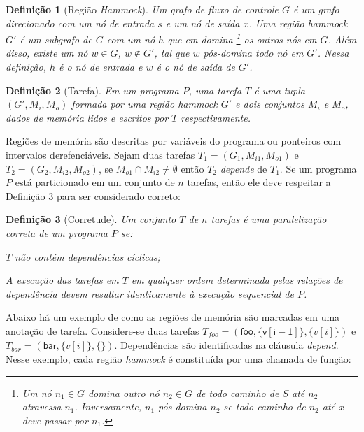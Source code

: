 \documentclass[sigplan,10pt,review]{acmart}
\newtheorem{Definicao}{Defini\c{c}\~{a}o}
\begin{document}
\begin{Definicao} [Região \textit{Hammock}]
\label{def:hammock}
Um grafo de fluxo de controle $G$ é um grafo direcionado com um nó de entrada
$s$ e um nó de saída $x$. Uma região \textit{hammock} $G'$ é um subgrafo de $G$ com um nó $h$ que {em domina}
\footnote{Um nó $n_1 \in G$ domina outro nó
$n_2 \in G$ de todo caminho de  $S$ até $n_2$ atravessa $n_1$.
Inversamente, $n_1$ pós-domina $n_2$ se todo caminho de $n_2$ até $x$ deve passar por $n_1$.} os outros nós em $G$.
Além disso, existe um nó $w \in G$, $w \notin G'$, tal que $w$ {\em pós-domina} todo nó em $G'$. Nessa definição,
$h$ é o nó de entrada e $w$ é o nó de saída de $G'$.  
\end{Definicao}

\begin{Definicao} [Tarefa]
\label{def:task}
Em um programa $P$, uma tarefa $T$ é uma tupla $(G', M_i, M_o)$ formada
por uma região \textit{hammock} $G'$ e dois conjuntos $M_i$ e $M_o$, dados de memória lidos e escritos por $T$ respectivamente.
\end{Definicao}

Regiões de memória são descritas por variáveis do programa ou ponteiros com intervalos derefenciáveis.
Sejam duas tarefas $T_1 = (G_1, M_{i1}, M_{o1})$ e $T_2 = (G_2, M_{i2}, M_{o2})$, 
se $M_{o1} \cap M_{i2} \neq \emptyset$ então $T_2$ {\em depende} de $T_1$. Se um programa $P$ está particionado em um 
conjunto de $n$ tarefas, então ele deve respeitar a Definição \ref{def:corretude} para ser considerado correto:

\begin{Definicao} [Corretude]
\label{def:corretude}
Um conjunto $T$ de $n$ tarefas é uma paralelização correta de um programa $P$ se:
\begin{compactenum}
\item $T$ não contém dependências cíclicas;
\item A execução das tarefas em $T$ em qualquer ordem determinada pelas relações de dependência devem resultar
identicamente à execução sequencial de $P$.
\end{compactenum}
\end{Definicao}

Abaixo há um exemplo de como as regiões de memória são marcadas em uma anotação de tarefa.
Considere-se duas tarefas $T_{\mathit{foo}} = (\mathsf{foo}, \{\mathsf{v[i - 1]}\},
\{v[i]\})$ e $T_{\mathit{bar}} = (\mathsf{bar}, \{v[i]\}, \{\})$. Dependências são identificadas na cláusula \textit{depend}. 
Nesse exemplo, cada região \textit{hammock} é constituída por uma chamada de função:
\end{document}
